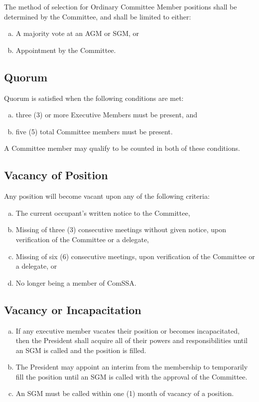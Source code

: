 \documentclass[a4paper,12pt]{article}
\begin{document}
The method of selection for Ordinary Committee Member positions shall be determined by the Committee, and shall be limited to either:

\begin{enumerate}[a)]
	\item A majority vote at an AGM or SGM, or
	\item Appointment by the Committee.
\end{enumerate}

\subsection{Quorum}

Quorum is satisfied when the following conditions are met:

\begin{enumerate}[a)]
    \item three (3) or more Executive Members must be present, and
    \item five (5) total Committee members must be present.
\end{enumerate}

A Committee member may qualify to be counted in both of these conditions.

\subsection{Vacancy of Position}

Any position will become vacant upon any of the following criteria:

\begin{enumerate}[a)]
	\item The current occupant's written notice to the Committee,
	\item Missing of three (3) consecutive meetings without given notice, upon verification of the Committee or a delegate,
	\item Missing of six (6) consecutive meetings, upon verification of the Committee or a delegate, or
	\item No longer being a member of ComSSA.
\end{enumerate}

\subsection{Vacancy or Incapacitation}

\begin{enumerate}[a)]
	\item If any executive member vacates their position or becomes incapacitated, then the President shall acquire all of their powers and responsibilities until an SGM is called and the position is filled.
	\item The President may appoint an interim from the membership to temporarily fill the position until an SGM is called with the approval of the Committee.
	\item An SGM must be called within one (1) month of vacancy of a position.
\end{enumerate}
\end{document}
